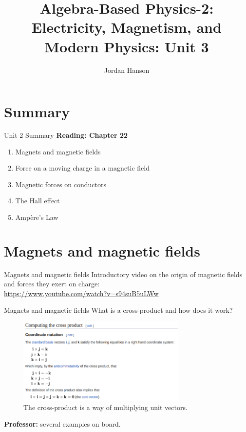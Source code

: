 \documentclass{beamer}
\title{Algebra-Based Physics-2: Electricity, Magnetism, and Modern Physics: Unit 3}
\author{Jordan Hanson}
\institute{Whittier College Department of Physics and Astronomy}
\begin{document}
\maketitle

\section{Summary}

\begin{frame}{Unit 2 Summary}
\textbf{Reading: Chapter 22}
\begin{enumerate}
\item Magnets and magnetic fields
\item Force on a moving charge in a magnetic field
\item Magnetic forces on conductors
\item \alert{The Hall effect}
\item \alert{Amp\`{e}re's Law}
\end{enumerate}
\end{frame}

\section{Magnets and magnetic fields}

\begin{frame}{Magnets and magnetic fields}
Introductory video on the origin of magnetic fields and forces they exert on charge: \\ \vspace{0.5cm}
\url{https://www.youtube.com/watch?v=s94suB5uLWw}
\end{frame}

\begin{frame}{Magnets and magnetic fields}
What is a cross-product and how does it work? \\ \vspace{0.25cm}
\begin{figure}
\centering
\includegraphics[width=0.75\textwidth]{figures/crossP.png}
\caption{\label{fig:crossP} The cross-product is a way of multiplying unit vectors.}
\end{figure}
\textbf{Professor:} several examples on board.
\end{frame}
\end{document}
